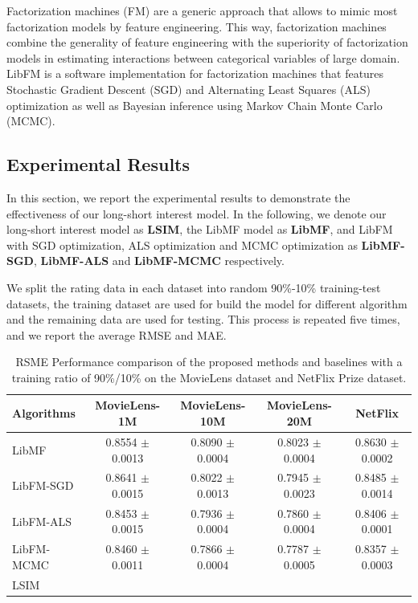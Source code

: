 \documentclass{sig-alternate-05-2015}
\begin{document}
Factorization machines (FM) are a generic approach that
allows to mimic most factorization models by feature engineering.
This way, factorization machines combine the generality of
feature engineering with the superiority of factorization models
in estimating interactions between categorical variables of large domain.
LibFM \cite{rendle2012factorization} is a software implementation
for factorization machines that features
Stochastic Gradient Descent (SGD) and
Alternating Least Squares (ALS) optimization as well as
Bayesian inference using Markov Chain Monte Carlo (MCMC).

\subsection{Experimental Results}
In this section, we report the experimental results to demonstrate
the effectiveness of our long-short interest model.
In the following, we denote our long-short interest model as \textbf{LSIM},
the LibMF model as \textbf{LibMF}, and LibFM with SGD optimization,
ALS optimization and MCMC optimization as \textbf{LibMF-SGD},
\textbf{LibMF-ALS} and \textbf{LibMF-MCMC} respectively.

We split the rating data in each dataset into random 90\%-10\% training-test datasets,
the training dataset are used for build the model for different algorithm and
the remaining data are used for testing. This process is repeated five times,
and we report the average RMSE and MAE.

\begin{table}[htpb]
	\centering
	\caption{RSME Performance comparison of the proposed methods and baselines with a training ratio of 90\%/10\%
    on the MovieLens dataset and NetFlix Prize dataset.}
	\label{tab:msre}
	\begin{tabular}{|l|c|c|c|c|}
		\hline
		\textbf{Algorithms} & \textbf{MovieLens-1M} & \textbf{MovieLens-10M} & \textbf{MovieLens-20M}  & \textbf{NetFlix} \\
		\hline
		LibMF      & 0.8554 $\pm$ 0.0013 & 0.8090 $\pm$ 0.0004 & 0.8023 $\pm$ 0.0004 & 0.8630 $\pm$ 0.0002 \\
		LibFM-SGD  & 0.8641 $\pm$ 0.0015 & 0.8022 $\pm$ 0.0013 & 0.7945 $\pm$ 0.0023 & 0.8485 $\pm$ 0.0014 \\
		LibFM-ALS  & 0.8453 $\pm$ 0.0015 & 0.7936 $\pm$ 0.0004 & 0.7860 $\pm$ 0.0004 & 0.8406 $\pm$ 0.0001 \\
        LibFM-MCMC & 0.8460 $\pm$ 0.0011 & 0.7866 $\pm$ 0.0004 & 0.7787 $\pm$ 0.0005 & 0.8357 $\pm$ 0.0003 \\
		LSIM       &  &  &  & \\
		\hline
	\end{tabular}
\end{table}
\end{document}
